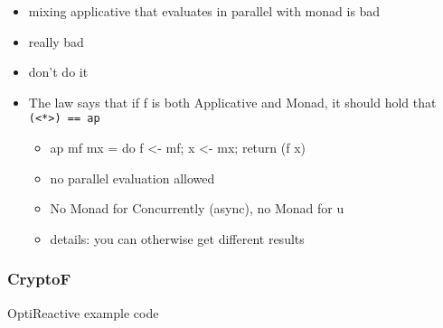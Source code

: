 \begin{itemize}
\item mixing applicative that evaluates in parallel with monad is bad
\item really bad
\item don't do it
\item The law says that if f is both Applicative and Monad, it should
  hold that \texttt{(<*>) == ap}
  \begin{itemize}
  \item ap mf mx = do f <- mf; x <- mx; return (f x)
  \item no parallel evaluation allowed
  \item No Monad for Concurrently (async), no Monad for u
  \item details: you can otherwise get different results
  \end{itemize}
\end{itemize}

\subsubsection{CryptoF}
\label{sec:cryptof}

\begin{listing}[htp]
  \caption{OptiReactive example code}
  \label{lst:optireactive-example-code}
\end{listing}


